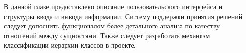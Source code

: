 В данной главе предоставлено описание пользовательского интерфейса и структуры ввода и вывода информации. Систему поддержки принятия решений следует дополнить функционалом более детального анализа по качеству отношений между сущностями. Также следует разработать механизм классификации иерархии классов в проекте.

\clearpage
